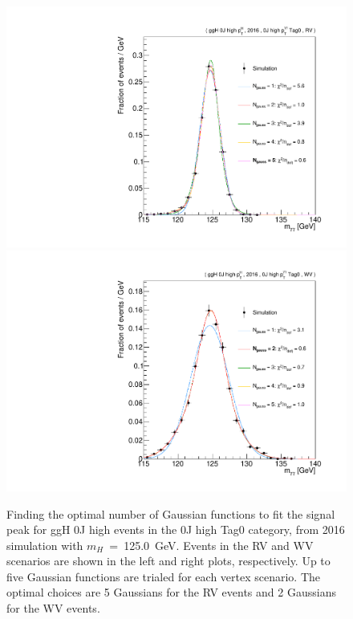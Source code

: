 \begin{figure}[hptb]
  \centering
  \includegraphics[width=.49\textwidth]{Figures/hgg_stats/fTest_RECO_0J_PTH_GT10_Tag0_GG2H_0J_PTH_GT10_RV.pdf}
  \hfill
  \includegraphics[width=.49\textwidth]{Figures/hgg_stats/fTest_RECO_0J_PTH_GT10_Tag0_GG2H_0J_PTH_GT10_WV.pdf}
  \caption[Signal modelling: number of Gaussians]
  {
    Finding the optimal number of Gaussian functions to fit the signal peak for ggH 0J high \ptH events in the 0J high \ptgg Tag0 category, from 2016 simulation with $m_H$~=~125.0~GeV. Events in the RV and WV scenarios are shown in the left and right plots, respectively. Up to five Gaussian functions are trialed for each vertex scenario. The optimal choices are 5 Gaussians for the RV events and 2 Gaussians for the WV events.
  }
  \label{fig:sigmodels_ftest}
\end{figure}

